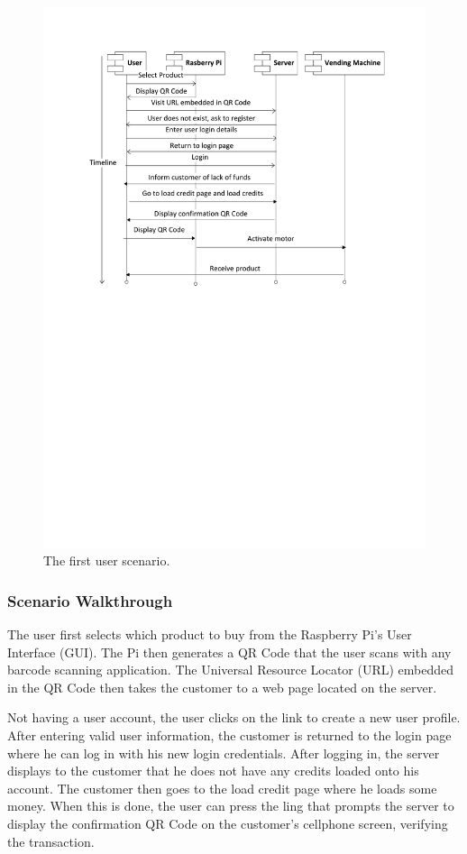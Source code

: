 \begin{figure}
 \centering 
 \includegraphics[clip=true, trim = 0 410 0 60,
 scale=0.7]{user_story_1}
 \caption{The first user scenario.}
 \label{fig:test1}
\end{figure}

\subsubsection{Scenario Walkthrough}

The user first selects which product to buy from the Raspberry
Pi's User Interface (GUI). The Pi then generates a QR Code that the
user scans with any barcode scanning application. The Universal Resource
Locator (URL) embedded in the QR Code then takes the customer to a web page
located on the server.

Not having a user account, the user clicks on the link to create a new user
profile. After entering valid user information, the customer is returned to the
login  page where he can log in with his new login credentials. After logging
in, the server displays to the customer that he does not have any credits
loaded onto his account. The customer then goes to the load credit page where
he loads some money. When this is done, the user can press the ling that
prompts the server to display the confirmation QR Code on the customer's
cellphone screen, verifying the transaction.

